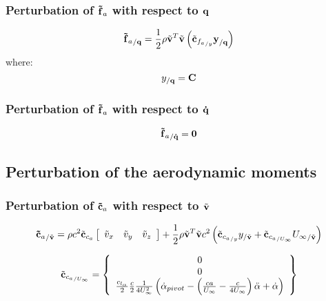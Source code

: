 \subsubsection{Perturbation of $\bm{\mathbf{\tilde{f}}}_a$ with respect to $\bm{\mathbf{q}}$}
\begin{equation}
{\bm{\mathbf{\tilde{f}}}_a}_{/\bm{\mathbf{q}}} = 
	\frac{1}{2} \rho \tilde{\bm{\mathbf{v}}}^T \tilde{\bm{\mathbf{v}}} 
	\left(  \tilde{\bm{\mathbf{c}}}_{{f_{a}}_{/y}} \bm{\mathbf{y}}_{/\bm{\mathbf{q}}}  \right) 
\end{equation}
where:
\begin{equation}
y_{/\bm{\mathbf{q}}} = \bm{\mathbf{C}} 
\end{equation}

\subsubsection{Perturbation of $\bm{\mathbf{\tilde{f}}}_a$ with respect to $\bm{\mathbf{\dot{q}}}$}
\begin{equation}
{\bm{\mathbf{\tilde{f}}}_a}_{/\bm{\mathbf{\dot{q}}}} = \bm{\mathbf{0}}
\end{equation}

\subsection{Perturbation of the aerodynamic moments}
\subsubsection{Perturbation of $\bm{\mathbf{\tilde{c}}}_a$ with respect to $\tilde{\bm{\mathbf{v}}}$}
		
\begin{equation}
{\bm{\mathbf{\tilde{c}}}_a}_{/\tilde{\bm{\mathbf{v}}}} = 
	\rho c^2 \tilde{\bm{\mathbf{c}}}_{c_{a}} \left[
		\begin{array}{ccc}
			\tilde{v}_x & \tilde{v}_y & \tilde{v}_z
		\end{array} \right] +
	\frac{1}{2} \rho \tilde{\bm{\mathbf{v}}}^T \tilde{\bm{\mathbf{v}}} c^2
	\left(  \tilde{\bm{\mathbf{c}}}_{{c_{a}}_{/y}} y_{/\tilde{\bm{\mathbf{v}}}} + 
	\tilde{\bm{\mathbf{c}}}_{{c_{a}}_{/U_{\infty}}} {U_\infty}_{/\tilde{\bm{\mathbf{v}}}}  \right) 
\end{equation}

\begin{equation}
\tilde{\bm{\mathbf{c}}}_{{c_{a}}_{/U_{\infty}}} = \left\{
	\begin{array}{c}
		0 \\
		0 \\
		\frac{c_{l_{\alpha}}}{2} \frac{c}{2} \frac{1}{4 U_\infty^2} 
		\left(  \dot{\alpha}_{pivot} - \left(  \frac{c a}{U_\infty} - \frac{c}{4 U_\infty}  \right) \ddot{\alpha} + \dot{\alpha} \right)
	\end{array} \right\}
\end{equation}

